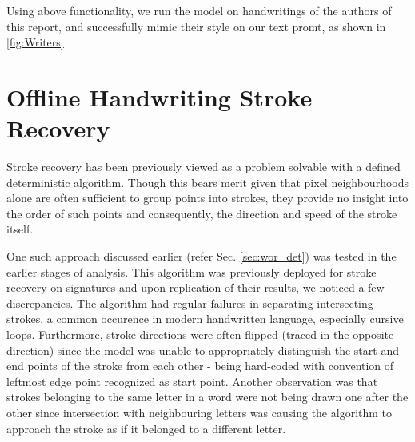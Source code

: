 \documentclass[10pt,twocolumn,letterpaper]{article}
\begin{document}
Using above functionality, we run the model on handwritings of the authors of this report, and successfully mimic their style on our text promt, as shown in \ref{fig:Writers} 
\section{Offline Handwriting Stroke Recovery} \label{deterministic-wor}

Stroke recovery has been previously viewed as a problem solvable with a defined deterministic algorithm. Though this bears merit given that pixel neighbourhoods alone are often sufficient to group points into strokes, they provide no insight into the order of such points and consequently, the direction and speed of the stroke itself.

One such approach discussed earlier (refer Sec. \ref{sec:wor_det}) was tested in the earlier stages of analysis. This algorithm was previously deployed for stroke recovery on signatures and upon replication of their results, we noticed a few discrepancies. The algorithm had regular failures in separating intersecting strokes, a common occurence in modern handwritten language, especially cursive loops. Furthermore, stroke directions were often flipped (traced in the opposite direction) since the model was unable to appropriately distinguish the start and end points of the stroke from each other - being hard-coded with convention of leftmost edge point recognized as start point. Another observation was that strokes belonging to the same letter in a word were not being drawn one after the other since intersection with neighbouring letters was causing the algorithm to approach the stroke as if it belonged to a different letter.
\end{document}
